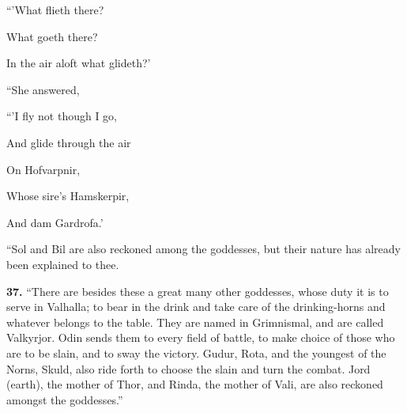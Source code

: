 ``'What flieth there?

What goeth there?

In the air aloft what glideth?'

``She answered,

``'I fly not though I go,

And glide through the air

On Hofvarpnir,

Whose sire's Hamskerpir,

And dam Gardrofa.'

``Sol and Bil are also reckoned among the goddesses, but their nature
has already been explained to thee.

\textbf{37.} ``There are besides these a great many other goddesses, whose
duty it is to serve in Valhalla; to bear in the drink and take care of
the drinking-horns and whatever belongs to the table. They are named
in Grimnismal, and are called Valkyrjor. Odin sends them to every
field of battle, to make choice of those who are to be slain, and to
sway the victory. Gudur, Rota, and the youngest of the Norns, Skuld,
also ride forth to choose the slain and turn the combat. Jord (earth),
the mother of Thor, and Rinda, the mother of Vali, are also reckoned
amongst the goddesses.''


